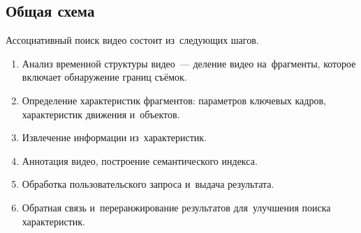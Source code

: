 \subsection{Общая схема}

Ассоциативный поиск видео состоит из~следующих шагов.
\begin{enumerate}
    \item Анализ временной структуры видео~—
        деление видео на~фрагменты, которое включает обнаружение границ съёмок.
    \item Определение характеристик фрагментов:
        параметров ключевых кадров,
        характеристик движения и~объектов.
    \item Извлечение информации из~характеристик.
    \item Аннотация видео, построение семантического индекса.
    \item Обработка пользовательского запроса и~выдача результата.
    \item Обратная связь и~переранжирование результатов для~улучшения поиска характеристик.
\end{enumerate}

\pagebreak


